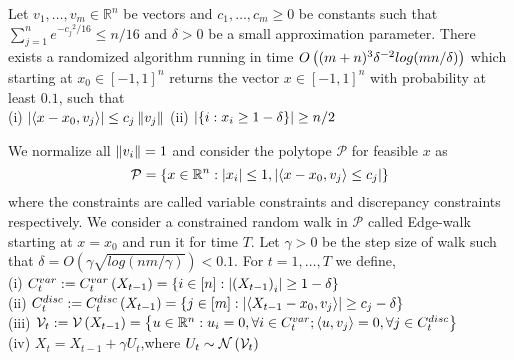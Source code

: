 \begin{lemma} \label{pcl}
Let $v_1,\hdots,v_m \in \mathbb{R}^n$ be vectors and $c_1,\hdots,c_m \geq 0$ be constants such that $\sum_{j=1}^{n}e^{{-c_j}^2/16} \leq n/16$ and $\delta > 0$ be a small approximation parameter.
There exists a randomized algorithm running in time $O\left((m+n)^3{\delta}^{-2}log(mn/\delta) \right )$ which starting at $x_0 \in [-1,1]^n$ returns the vector $x \in [-1,1]^n$ with probability at least $0.1$, such that\\
\qquad (i) $\left\lvert \left\langle x-x_0,v_j\right\rangle \right\rvert \leq c_j\left\lVert v_j \right\rVert$ \qquad \qquad \qquad \qquad
(ii) $\left\lvert \left\{i:x_i \geq 1- \delta\right\} \right\rvert \geq n/2$
\end{lemma}
We normalize all $\left\lVert v_i \right\rVert=1$ and consider the polytope $\mathcal{P}$ for feasible $x$ as 
\[ \mathcal{P} = \left\{x\in \mathbb{R}^n : \left\lvert x_i \right\rvert \leq 1, \left\lvert \left\langle x-x_0,v_j\right\rangle \leq c_j \right\rvert \right\}\] where the constraints are called variable constraints and discrepancy constraints respectively. 
We consider a constrained random walk in $\mathcal{P}$ called Edge-walk starting at $x=x_0$ and run it for time $T$. Let $\gamma >0$ be the step size of walk such that $\delta = O(\gamma \sqrt{log(nm/\gamma)}) < 0.1$. For $t= 1,\hdots,T$ we define,\\
(i) $C_t^{var} := C_t^{var}\left(X_{t-1} \right ) = \left\{ i \in [n] : \left\lvert \left(X_{t-1} \right )_i \right\rvert \geq 1- \delta\right\}$ \\
(ii) $C_t^{disc} := C_t^{disc}\left(X_{t-1} \right ) = \left\{j \in [m] : \left\lvert \left\langle X_{t-1}-x_0,v_j\right\rangle \right\rvert \geq c_j - \delta\right\}$ \\
(iii) $\mathcal{V}_t := \mathcal{V}\left(X_{t-1} \right ) = \left\{u \in \mathbb{R}^n : u_i = 0, \forall i \in C_t^{var}; \left\langle u,v_j\right\rangle=0, \forall j \in C_t^{disc} \right\}$  \\
(iv) $X_t = X_{t-1} + \gamma U_t$,where $U_t \sim \mathcal{N}\left(\mathcal{V}_t \right )$

